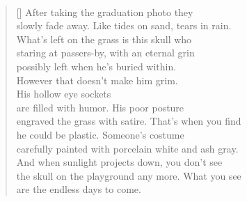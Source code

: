 \documentclass{book}
\begin{document}
\newpage
\poemtitle{\textcolor[RGB]{175,25,25}{The skull on the playground}}
\hspace*{\fill} \\
\settowidth{\versewidth}{engraved the grass with satire. That's when you find}
\begin{verse}[\versewidth]
    After taking the graduation photo they\\
    slowly fade away. Like tides on sand, tears in rain.\\
    What's left on the grass is this skull who\\
    staring at passers-by, with an eternal grin\\
    possibly left when he's buried within. \\
    However that doesn't make him grim. \\
    His hollow eye sockets\\
    are filled with humor. His poor posture \\
    engraved the grass with satire. That's when you find\\
    he could be plastic. Someone's costume\\
    carefully painted with porcelain white and ash gray.\\
    And when sunlight projects down, you don't see\\
    the skull on the playground any more. What you see\\
    are the endless days to come.\\
\end{verse}
\end{document}
